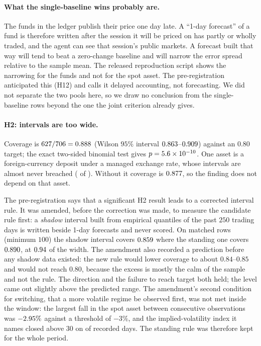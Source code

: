 \documentclass[11pt,a4paper]{article}
\begin{document}
\paragraph{What the single-baseline wins probably are.} The funds in the
ledger publish their price one day late. A ``1-day forecast'' of a fund is
therefore written after the session it will be priced on has partly or wholly
traded, and the agent can see that session's public markets. A forecast built
that way will tend to beat a zero-change baseline and will narrow the error
spread relative to the sample mean. The released reproduction script shows the
narrowing for the funds and not for the spot asset. The pre-registration anticipated
this (H12) and calls it delayed accounting, not forecasting. We did not
separate the two pools here, so we draw no conclusion from the single-baseline
rows beyond the one the joint criterion already gives.

\paragraph{H2: intervals are too wide.} Coverage is
$627/706 = 0.888$ (Wilson $95\%$ interval $0.863$--$0.909$) against
an $0.80$ target; the exact two-sided binomial test gives $p = 5.6\times10^{-10}$. One
asset is a foreign-currency deposit under a managed exchange rate, whose
intervals are almost never breached (\CovFxK{} of \CovFxN). Without it
coverage is $0.877$, so the finding does not depend on that asset.

The pre-registration says that a significant H2 result leads to a corrected
interval rule. It was amended, before the correction was made, to measure the
candidate rule first: a \emph{shadow} interval built from empirical quantiles
of the past $250$ trading days is written beside 1-day forecasts and never
scored. On \ShadowN{} matched rows (minimum $100$) the shadow interval covers
$0.859$ where the standing one covers $0.890$, at
$0.94$ of the width. The amendment also recorded a prediction
before any shadow data existed: the new rule would lower coverage to about
$0.84$--$0.85$ and would not reach $0.80$, because the excess is mostly the
calm of the sample and not the rule. The direction and the failure to reach
target both held; the level came out slightly above the predicted range. The
amendment's second condition for switching, that a more volatile regime be
observed first, was not met inside the window: the largest fall in the spot
asset between consecutive observations was $-2.95\%$ against a threshold
of $-3\%$, and the implied-volatility index it names closed above $30$ on
\GvzAboveThirty{} of \GvzDays{} recorded days. The standing rule was therefore
kept for the whole period.
\end{document}

